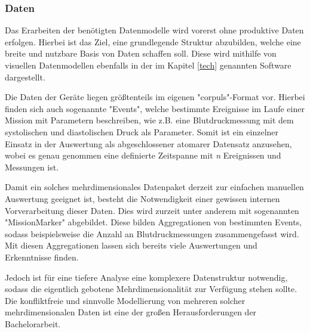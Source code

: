\documentclass[12pt]{article}
\begin{document}



\subsubsection{Daten}
Das Erarbeiten der benötigten Datenmodelle wird vorerst ohne produktive Daten
erfolgen. Hierbei ist das Ziel, eine grundlegende Struktur abzubilden, welche
eine breite und nutzbare Basis von Daten schaffen soll. Diese wird mithilfe von
visuellen Datenmodellen ebenfalls in der im Kapitel \ref{tech} genannten
Software dargestellt.

Die Daten der Geräte liegen größtenteils im eigenen "corpuls"-Format vor.
Hierbei finden sich auch sogenannte "Events", welche bestimmte Ereignisse im
Laufe einer Mission mit Parametern beschreiben, wie z.B. eine Blutdruckmessung
mit dem systolischen und diastolischen Druck als Parameter. Somit ist ein
einzelner Einsatz in der Auswertung als abgeschlossener atomarer Datensatz
anzusehen, wobei es genau genommen eine definierte Zeitspanne mit \textit{n}
Ereignissen und Messungen ist. 

Damit ein solches mehrdimensionales Datenpaket derzeit zur einfachen manuellen
Auswertung geeignet ist, besteht die Notwendigkeit einer gewissen internen
Vorverarbeitung dieser Daten. Dies wird zurzeit unter anderem mit sogenannten
"MissionMarker" abgebildet. Diese bilden Aggregationen von bestimmten Events,
sodass beispielsweise die Anzahl an Blutdruckmessungen zusammengefasst wird. Mit
diesen Aggregationen lassen sich bereits viele Auswertungen und Erkenntnisse
finden.

Jedoch ist für eine tiefere Analyse eine komplexere Datenstruktur notwendig,
sodass die eigentlich gebotene Mehrdimensionalität zur Verfügung stehen sollte.
Die konfliktfreie und sinnvolle Modellierung von mehreren solcher
mehrdimensionalen Daten ist eine der großen Herausforderungen der
Bachelorarbeit.


\clearpage
\end{document}
